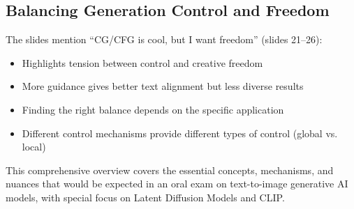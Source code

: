 \subsection*{Balancing Generation Control and Freedom}
The slides mention ``CG/CFG is cool, but I want freedom'' (slides 21--26):
\begin{itemize}
    \item Highlights tension between control and creative freedom
    \item More guidance gives better text alignment but less diverse results
    \item Finding the right balance depends on the specific application
    \item Different control mechanisms provide different types of control (global vs. local)
\end{itemize}

\bigskip
This comprehensive overview covers the essential concepts, mechanisms, and nuances that would be expected in an oral exam on text-to-image generative AI models, with special focus on Latent Diffusion Models and CLIP.
